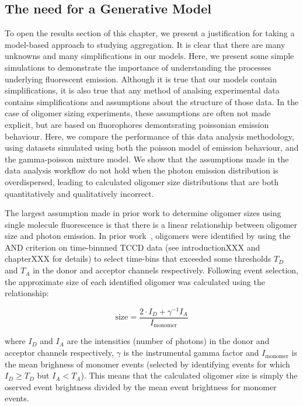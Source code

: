 \subsection{The need for a Generative Model}
To open the results section of this chapter, we present a justification for taking a model-based approach to studying aggregation. It is clear that there are many unknowns and many simplifications in our models. Here, we present some simple simulations to demonstrate the importance of understanding the processes underlying fluorescent emission. Although it is true that our models contain simplifications, it is also true that any method of analsing experimental data contains simplifications and assumptions about the structure of those data. In the case of oligomer sizing experiments, these assumptions are often not made explicit, but are based on fluorophores demontsrating poissonian emission behaviour. Here, we compare the performance of this data analysis methodology, using datasets simulated using both the poisson model of emission behaviour, and the gamma-poisson mixture model. We show that the assumptions made in the data analysis workflow do not hold when the photon emission distribution is overdispersed, leading to calculated oligomer size distributions that are both quantitatively and qualitatively incorrect. 

The largest assumption made in prior work to determine oligomer sizes using single molecule fluorescence is that there is a linear relationship between oligomer size and photon emission. In prior work~\cite{cremades2012}, oligomers were identified by using the AND criterion on time-binnned TCCD data (see introductionXXX and chapterXXX for details) to select time-bins that exceeded some thresholds $T_D$ and $T_A$ in the donor and acceptor channels respectively. Following event selection, the approximate size of each identified oligomer was calculated using the relationship:

\begin{equation}
\text{size} = \frac{2\cdot I_D + \gamma^{-1} I_A}{I_{\text{monomer}}}
\label{eq:size_linear}
\end{equation}

where $I_D$ and $I_A$ are the intensities (number of photons) in the donor and acceptor channels respectively, $\gamma$ is the instrumental gamma factor and $I_{\text{monomer}}$ is the mean brighness of monomer events (selected by identifying events for which $I_D \geq T_D$ but $I_A < T_A$). This means that the calculated oligomer size is simply the oserved event brightness divided by the mean event brightness for monomer events.

